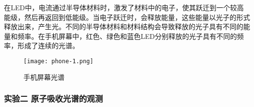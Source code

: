 \documentclass[dvipsnames, svgnames,a4paper,11pt]{article}
\begin{document}
\begin{enumerate}
				在LED中，电流通过半导体材料时，激发了材料中的电子，使其跃迁到一个较高能级，然后再返回到低能级。当电子跃迁时，会释放能量，这些能量以光子的形式释放出来，产生光。不同的半导体材料和材料结构会导致释放的光子具有不同的能量和频率。在手机屏幕中，红色、绿色和蓝色LED分别释放的光子具有不同的频率，形成了连续的光谱。
				
				\begin{figure}[htbp]
					\centering
					\texttt{[image: phone-1.png]}
					\caption{手机屏幕光谱}
					\label{fig:phone-1}
				\end{figure}
				
		\end{enumerate}
		

		
	\subsubsection{实验二 原子吸收光谱的观测}
			
\end{document}
